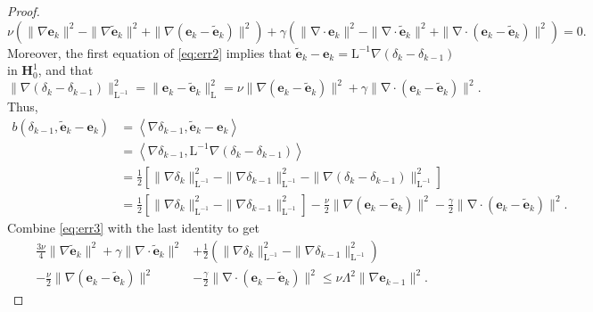 \documentclass[3p]{elsarticle}
\def\V#1{\mathbf{#1}}
\def\Vt#1{\mathbf{\tilde{#1}}}
\newcommand{\divergence}{\mathrm{\nabla \cdot}}
\newcommand{\Lmap}{\mathrm{L}}
\newcommand{\Linvmap}{\mathrm{L^{-1}}}
\begin{document}
\begin{proof}
\begin{equation}\label{eq:err4}
\nu \left( \|\nabla \V{e}_{k} \|^2 - \|\nabla \V{\tilde{e}}_{k} \|^2 + \|\nabla (\V{e}_{k}  - \Vt{e}_{k}) \|^2 \right) + 
\gamma \left( \|\divergence \V{e}_{k} \|^2 - \|\divergence \V{\tilde{e}}_{k} \|^2 + \|\divergence (\V{e}_{k}  - \Vt{e}_{k}) \|^2 \right) = 0.
\end{equation}
Moreover, the first equation of \eqref{eq:err2} implies that $\Vt{e}_{k}-\V{e}_{k} = \Linvmap \nabla (\delta_{k}  - \delta_{k-1})$  in $\V{H}^{1}_0$, and that
\begin{equation}\label{eq:err5}
\|\nabla (\delta_{k}  - \delta_{k-1}) \|^2_{\Linvmap} = \|\V{e}_{k}  - \Vt{e}_{k} \|^2_{\Lmap}
= \nu \|\nabla(\V{e}_{k}  - \Vt{e}_{k}) \|^2 + 
\gamma \|\divergence(\V{e}_{k}  - \Vt{e}_{k}) \|^2.
\end{equation}
Thus, 
\begin{equation}
    \label{eq:err6}
    \begin{aligned}        
b(\delta_{k-1}, \V{\tilde{e}}_k - \V{e}_k) & = \left\langle \nabla \delta_{k-1},  \V{\tilde{e}}_k - \V{e}_k \right \rangle \\ 
& = \left\langle \nabla \delta_{k-1}, \Linvmap \nabla (\delta_{k}  - \delta_{k-1}) \right \rangle \\
& = \frac{1}{2} \left[\|\nabla \delta_{k} \|^2_{\Linvmap} - \|\nabla \delta_{k-1} \|^2_{\Linvmap} - \|\nabla (\delta_{k}  - \delta_{k-1}) \|^2_{\Linvmap} \right] \\
& = \frac{1}{2} \left[\|\nabla \delta_{k} \|^2_{\Linvmap} - \|\nabla \delta_{k-1} \|^2_{\Linvmap} \right]  - \frac{\nu}{2}  \|\nabla (\V{e}_{k}  - \Vt{e}_{k}) \|^2
-\frac{\gamma}{2} \|\divergence(\V{e}_{k}  - \Vt{e}_{k}) \|^2.
    \end{aligned}
\end{equation}
Combine \eqref{eq:err3} with the last identity to get
\begin{equation}\label{eq:err7}   
\begin{aligned}
\frac{3\nu}{4} \|\nabla \V{\tilde{e}}_{k} \|^2 
+ \gamma \| \nabla \cdot \V{\tilde{e}}_{k} \|^2 
& + \frac{1}{2} \left( \|\nabla \delta_{k} \|^2_{\Linvmap} - \|\nabla \delta_{k-1} \|^2_{\Linvmap} \right) \\
- \frac{\nu}{2}  \|\nabla (\V{e}_{k}  - \Vt{e}_{k}) \|^2
& -\frac{\gamma}{2} \|\divergence(\V{e}_{k}  - \Vt{e}_{k}) \|^2  \le \nu \Lambda^2 \|\nabla \V{e}_{k-1} \|^2.
\end{aligned}
\end{equation}

\end{proof}
\end{document}

